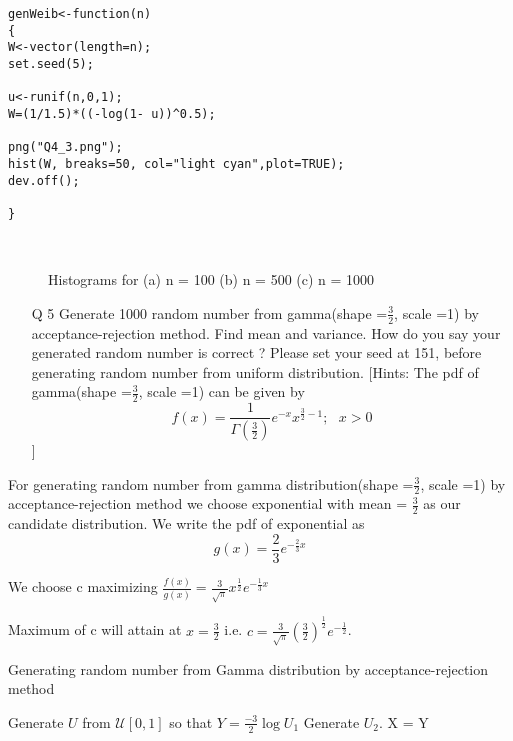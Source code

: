 \documentclass[11pt]{article}
\begin{document}
\begin{lstlisting}
genWeib<-function(n)
{
W<-vector(length=n);
set.seed(5);

u<-runif(n,0,1);
W=(1/1.5)*((-log(1- u))^0.5);

png("Q4_3.png");
hist(W, breaks=50, col="light cyan",plot=TRUE);
dev.off();

}
\end{lstlisting}

\begin{figure}[H]
  \centering
  \\
      \caption{Histograms for (a) n = 100 (b) n = 500 (c) n = 1000}
\end{figure}
 
\begin{enumerate}
\item[Q 5]  Generate 1000 random number from gamma(shape =$\frac{3}{2}$, scale =1) by acceptance-rejection method. Find mean and variance.  How do you say your generated random number is correct ? Please set your seed at 151, before generating random number from uniform distribution.  
[Hints: The pdf of gamma(shape =$\frac{3}{2}$, scale =1) can be given by 
$$ f(x) = \frac{1}{\Gamma(\frac{3}{2})}e^{-x} x^{\frac{3}{2} - 1}; ~~~ x > 0 $$]
\end{enumerate}

For generating random number from gamma distribution(shape =$\frac{3}{2}$, scale =1) by acceptance-rejection method we choose exponential with mean = $\frac{3}{2}$ as our candidate distribution. We write the pdf of exponential as
$$ g(x) = \frac{2}{3}e^{-\frac{2}{3}x}$$

We choose c maximizing $\frac{f(x)}{g(x)} = \frac{3}{\sqrt{\pi}}x^{\frac{1}{2}} e^{-\frac{1}{3} x}$

Maximum of c will attain at $x = \frac{3}{2}$ i.e. $c = \frac{3}{\sqrt{\pi}}(\frac{3}{2})^{\frac{1}{2}} e^{-\frac{1}{2}}$.

\begin{algorithm}[H]
\caption{Generating random number from Gamma distribution by acceptance-rejection method}
\begin{algorithmic}[1]
\STATE Generate $U$ from $\mathcal{U}[0,1]$ so that $Y = \frac{-3}{2}\log U_{1} $
\STATE Generate $U_{2}$.
\STATE {}
       \STATE  X = Y
       \ENDIF
\end{algorithmic}
\end{algorithm}
\end{document}
